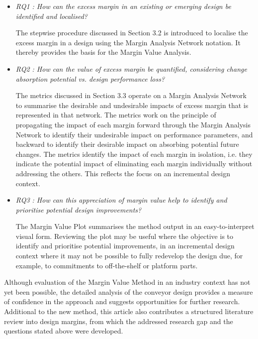 \begin{itemize}
\item \emph{RQ1 : How can the excess margin in an existing or emerging design be identified and localised?}

The stepwise procedure discussed in Section 3.2 is introduced to localise the excess margin in a design using the Margin Analysis Network notation. It thereby provides the basis for the Margin Value Analysis.

\item \emph{RQ2 : How can the value of excess margin be quantified, considering change absorption potential vs. design performance loss?}

The metrics discussed in Section 3.3 operate on a Margin Analysis Network to summarise the desirable and undesirable impacts of  excess margin that is represented in that network. The metrics work on the principle of propagating the impact of each margin forward through the Margin Analysis Network to identify their undesirable impact on performance parameters, and backward to identify their desirable impact on absorbing potential future changes. The metrics identify the impact of each margin in isolation, i.e. they indicate the potential impact of eliminating each margin individually without addressing the others. This reflects the focus on an incremental design context.

\item \emph{RQ3 : How can this appreciation of margin value help to identify and prioritise potential design improvements?}

The Margin Value Plot summarises the method output in an easy-to-interpret visual form. Reviewing the plot may be useful where the objective is to identify and prioritise potential improvements, in an incremental design context where it may not be possible to fully redevelop the design due, for example, to commitments to off-the-shelf or platform parts.

\end{itemize}

 Although evaluation of the Margin Value Method in an industry context has not yet been possible, the detailed analysis of the conveyor design provides a measure of confidence in the approach and suggests opportunities for further research. Additional to the new method, this article also contributes a structured literature review into design margins, from which the addressed research gap and the questions stated above were developed.


